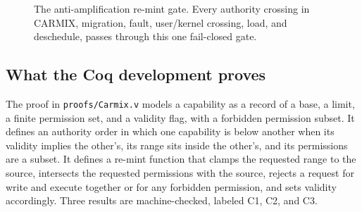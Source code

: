 \documentclass[10pt,twocolumn]{article}
\newcommand{\carmix}{CARMIX}
\begin{document}
\begin{figure}[t]
\centering
{}
\caption{The anti-amplification re-mint gate. Every authority crossing in
\carmix{}, migration, fault, user/kernel crossing, load, and deschedule, passes
through this one fail-closed gate.}
\label{fig:gate}
\end{figure}

\subsection{What the Coq development proves}

The proof in \texttt{proofs/Carmix.v} models a capability as a record of a base, a
limit, a finite permission set, and a validity flag, with a forbidden permission
subset. It defines an authority order in which one capability is below another
when its validity implies the other's, its range sits inside the other's, and its
permissions are a subset. It defines a re-mint function that clamps the requested
range to the source, intersects the requested permissions with the source, rejects
a request for write and execute together or for any forbidden permission, and sets
validity accordingly. Three results are machine-checked, labeled C1, C2, and C3.
\end{document}
